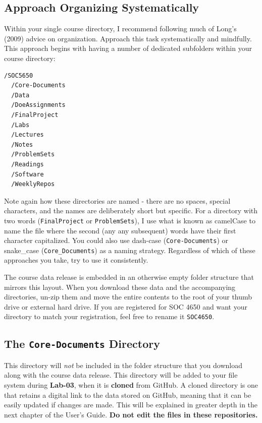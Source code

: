 \documentclass[]{book}
\theoremstyle{definition}
\theoremstyle{definition}
\theoremstyle{definition}
\theoremstyle{remark}
\begin{document}
\subsection{Approach Organizing
Systematically}\label{approach-organizing-systematically}

Within your single course directory, I recommend following much of
Long's (2009) advice on organization. Approach this task systematically
and mindfully. This approach begins with having a number of dedicated
subfolders within your course directory:

\begin{verbatim}
/SOC5650
  /Core-Documents
  /Data
  /DoeAssignments
  /FinalProject
  /Labs
  /Lectures
  /Notes
  /ProblemSets
  /Readings
  /Software
  /WeeklyRepos
\end{verbatim}

Note again how these directories are named - there are no spaces,
special characters, and the names are deliberately short but specific.
For a directory with two words (\texttt{FinalProject} or
\texttt{ProblemSets}), I use what is known as camelCase to name the file
where the second (any any subsequent) words have their first character
capitalized. You could also use dash-case (\texttt{Core-Documents}) or
snake\_case (\texttt{Core\_Documents}) as a naming strategy. Regardless
of which of these approaches you take, try to use it consistently.

The course data release is embedded in an otherwise empty folder
structure that mirrors this layout. When you download these data and the
accompanying directories, un-zip them and move the entire contents to
the root of your thumb drive or external hard drive. If you are
registered for SOC 4650 and want your directory to match your
registration, feel free to rename it \texttt{SOC4650}.

\subsection{\texorpdfstring{The \texttt{Core-Documents}
Directory}{The Core-Documents Directory}}\label{the-core-documents-directory}

This directory will \emph{not} be included in the folder structure that
you download along with the course data release. This directory will be
added to your file system during \textbf{Lab-03}, when it is
\textbf{cloned} from GitHub. A cloned directory is one that retains a
digital link to the data stored on GitHub, meaning that it can be easily
updated if changes are made. This will be explained in greater depth in
the next chapter of the User's Guide. \textbf{Do not edit the files in
these repositories.}
\end{document}
